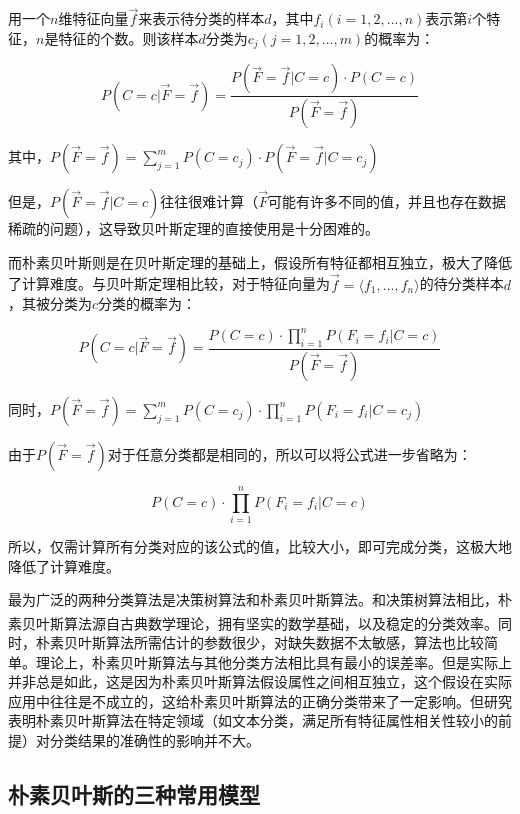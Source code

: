 \documentclass[UTF8,zihao=-4]{ctexart}
\newcommand{\upcite}[1]{\textsuperscript{\cite{#1}}}
\begin{document}
	用一个$n$维特征向量$\vec{f}$来表示待分类的样本$d$，其中$f_i(i=1,2,...,n)$表示第$i$个特征，$n$是特征的个数。则该样本$d$分类为$c_j(j=1,2,...,m)$的概率为：
	
	\begin{equation}
	\label{equ:nb}
	P(C=c|\vec{F}=\vec{f})=\frac{P(\vec{F}=\vec{f}|C=c)\cdot P(C=c) } {P(\vec{F}=\vec{f})}
	\end{equation}
	
	其中，$P(\vec{F}=\vec{f})=\sum\limits_{j=1}^{m} P(C=c_j) \cdot P(\vec{F}=\vec{f}|C=c_j)$
	
	但是，$P(\vec{F}=\vec{f}|C=c)$往往很难计算（$\vec{F}$可能有许多不同的值，并且也存在数据稀疏的问题），这导致贝叶斯定理的直接使用是十分困难的。
	
	而朴素贝叶斯则是在贝叶斯定理的基础上，假设所有特征都相互独立，极大了降低了计算难度。与贝叶斯定理相比较，对于特征向量为$\vec{f}=\langle f_1, \ldots, f_n \rangle$的待分类样本$d$，其被分类为$c$分类的概率为：
	
	\begin{equation}
	P(C=c|\vec{F}=\vec{f})=\frac{P(C=c) \cdot \prod\limits_{i=1}^{n} P(F_i=f_i|C=c)} {P(\vec{F}=\vec{f})}
	\end{equation}
		
	同时，$P(\vec{F}=\vec{f})=\sum\limits_{j=1}^{m} P(C=c_j) \cdot \prod\limits_{i=1}^{n}  P(F_i=f_i|C=c_j)$
	
	由于$P(\vec{F}=\vec{f})$对于任意分类都是相同的，所以可以将公式进一步省略为：
	
	\begin{equation}
	P(C=c) \cdot \prod\limits_{i=1}^{n} P(F_i=f_i|C=c)
	\end{equation}
	
	所以，仅需计算所有分类对应的该公式的值，比较大小，即可完成分类，这极大地降低了计算难度。
	
	最为广泛的两种分类算法是决策树算法和朴素贝叶斯算法。和决策树算法相比，朴素贝叶斯算法源自古典数学理论，拥有坚实的数学基础，以及稳定的分类效率\upcite{nb}。同时，朴素贝叶斯算法所需估计的参数很少，对缺失数据不太敏感，算法也比较简单。理论上，朴素贝叶斯算法与其他分类方法相比具有最小的误差率。但是实际上并非总是如此，这是因为朴素贝叶斯算法假设属性之间相互独立，这个假设在实际应用中往往是不成立的，这给朴素贝叶斯算法的正确分类带来了一定影响。但研究表明朴素贝叶斯算法在特定领域（如文本分类，满足所有特征属性相关性较小的前提）对分类结果的准确性的影响并不大。
	
\subsection{朴素贝叶斯的三种常用模型}
\end{document}
